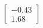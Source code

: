 \documentclass[preview]{standalone}
\begin{document}
\begin{align*}
\begin{bmatrix} -0.43 \\ 1.68 \end{bmatrix}
\end{align*}
\end{document}
